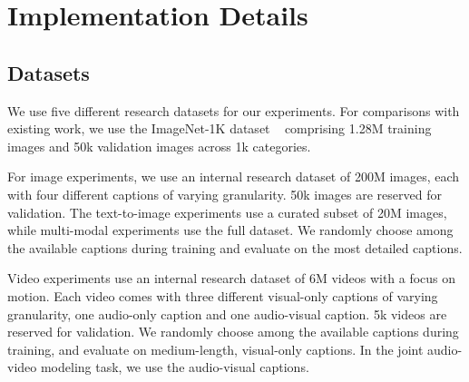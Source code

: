 \documentclass{article}
\theoremstyle{plain}
\theoremstyle{definition}
\theoremstyle{remark}
\begin{document}

\printAffiliationsAndNotice{}  %
\enlargethispage{2\baselineskip}

    

   


 




\newpage
\appendix
\onecolumn
\section{Implementation Details}
\label{app:implementation}

\subsection{Datasets}
We use five different research datasets for our experiments. For comparisons with existing work, we use the ImageNet-1K dataset ~\cite{imagenet} comprising 1.28M training images and 50k validation images across 1k categories.

For image experiments, we use an internal research dataset of 200M images, each with four different captions of varying granularity. 50k images are reserved for validation.
The text-to-image experiments use a curated subset of 20M images, while multi-modal experiments use the full dataset. We randomly choose among the available captions during training and evaluate on the most detailed captions.

Video experiments use an internal research dataset of 6M videos with a focus on motion. Each video comes with three different visual-only captions of varying granularity, one audio-only caption and one audio-visual caption. 5k videos are reserved for validation. We randomly choose among the available captions during training, and evaluate on medium-length, visual-only captions. In the joint audio-video modeling task, we use the audio-visual captions.
\end{document}
